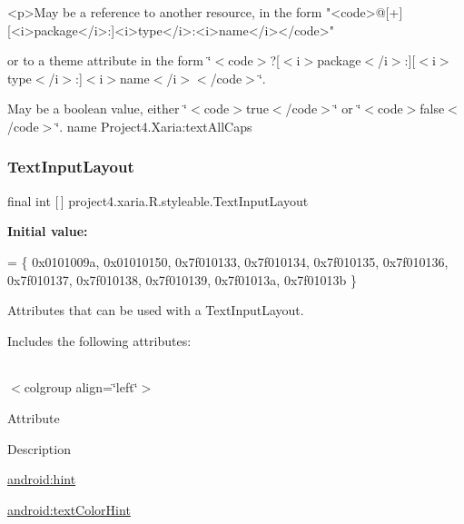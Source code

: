 \begin{DoxyVerb}      <p>May be a reference to another resource, in the form "<code>@[+][<i>package</i>:]<i>type</i>:<i>name</i></code>"
\end{DoxyVerb}
 or to a theme attribute in the form \char`\"{}$<$code$>$?\mbox{[}$<$i$>$package$<$/i$>$\+:\mbox{]}\mbox{[}$<$i$>$type$<$/i$>$\+:\mbox{]}$<$i$>$name$<$/i$>$$<$/code$>$\char`\"{}. 

May be a boolean value, either \char`\"{}$<$code$>$true$<$/code$>$\char`\"{} or \char`\"{}$<$code$>$false$<$/code$>$\char`\"{}.  name Project4.\+Xaria\+:text\+All\+Caps \mbox{\label{classproject4_1_1xaria_1_1R_1_1styleable_a5a2e4611c17d75c805194b416b9fed74}} 
\subsubsection{\texorpdfstring{Text\+Input\+Layout}{TextInputLayout}}
{\footnotesize\ttfamily final int \mbox{[}$\,$\mbox{]} project4.\+xaria.\+R.\+styleable.\+Text\+Input\+Layout\hspace{0.3cm}{\ttfamily [static]}}

{\bfseries Initial value\+:}
\begin{DoxyCode}
= \{
            0x0101009a, 0x01010150, 0x7f010133, 0x7f010134,
            0x7f010135, 0x7f010136, 0x7f010137, 0x7f010138,
            0x7f010139, 0x7f01013a, 0x7f01013b
        \}
\end{DoxyCode}
Attributes that can be used with a Text\+Input\+Layout. 

Includes the following attributes\+:

\tabulinesep=1mm
\begin{longtabu} spread 0pt [c]{*{0}{|X[-1]}|}
\hline
\end{longtabu}
$<$colgroup align=\char`\"{}left\char`\"{}$>$ 

Attribute

Description 

{\ttfamily \hyperlink{classproject4_1_1xaria_1_1R_1_1styleable_ae1bb656c3c7642a885f1739b13f02e81}{android\+:hint}}

{\ttfamily \hyperlink{classproject4_1_1xaria_1_1R_1_1styleable_ad0454b679c861e8e4733869036a95b28}{android\+:text\+Color\+Hint}}


